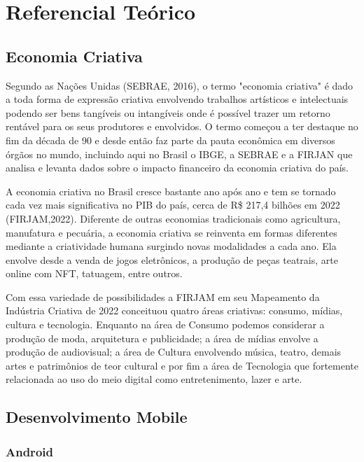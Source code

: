 \chapter{Referencial Teórico}\label{ch:referencial-teorico}

\section{Economia Criativa}\label{sec:economia-criativa}

Segundo as Nações Unidas (SEBRAE, 2016), o termo "economia criativa" é dado a toda forma de expressão criativa envolvendo trabalhos artísticos e intelectuais podendo ser bens tangíveis ou intangíveis onde é possível trazer um retorno rentável para os seus produtores e envolvidos.
O termo começou a ter destaque no fim da década de 90 e desde então faz parte da pauta econômica em diversos órgãos no mundo, incluindo aqui no Brasil o IBGE, a  SEBRAE e a FIRJAN que analisa e levanta dados sobre o impacto financeiro da economia criativa do país.

A economia criativa no Brasil cresce bastante ano após ano e tem se tornado cada vez mais significativa no PIB do país, cerca de R\$ 217,4 bilhões em 2022 (FIRJAM,2022).
Diferente de outras economias tradicionais como agricultura, manufatura e pecuária, a economia criativa se reinventa em formas diferentes mediante a criatividade humana surgindo novas modalidades a cada ano.
Ela envolve desde a venda de jogos eletrônicos, a produção de peças teatrais, arte online com NFT, tatuagem, entre outros.

Com essa variedade de possibilidades a FIRJAM em seu Mapeamento da Indústria Criativa de 2022 conceituou quatro áreas criativas: consumo, mídias, cultura e tecnologia.
Enquanto na área de Consumo podemos considerar a produção de moda, arquitetura e publicidade; a área de mídias envolve a produção de audiovisual; a área de Cultura envolvendo música, teatro, demais artes e patrimônios de teor cultural e por fim a área de Tecnologia que fortemente relacionada ao uso do meio digital como entretenimento, lazer e arte.

\section{Desenvolvimento Mobile}\label{sec:desenvolvimento-mobile}

\subsection{Android}\label{subsec:android}


